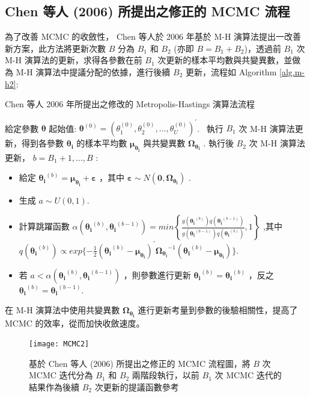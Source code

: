 \documentclass[12pt,a4paper]{article}
\begin{document}
\begin{CJK}{UTF8}{bkai}
\subsection*{Chen 等人 (2006) 所提出之修正的 MCMC 流程}\label{sec:6.1}
為了改善 MCMC 的收斂性， Chen 等人於 2006 年基於 M-H 演算法提出一改善新方案，此方法將更新次數 $B$ 分為 $B_1$ 和 $B_2$ (亦即 $B=B_1+B_2$)，透過前 $B_1$ 次 M-H 演算法的更新，求得各參數在前 $B_1$ 次更新的樣本平均數與共變異數，並做為 M-H 演算法中提議分配的依據，進行後續 $B_2$ 更新，流程如 Algorithm \ref{alg.m-h2}:
\begin{algorithm}
	\caption{Chen 等人 2006 年所提出之修改的 Metropolis-Hastings 演算法流程}
	\label{alg:3}
	\begin{algorithmic}[1]
	\STATE 給定參數 $\bm{\theta}$ 起始值: $\bm{\theta}^{(0)} = \left(\theta_1^{(0)},\theta_2^{(0)},\dots,\theta_U^{(0)}\right)^\prime$. \
    \STATE 執行 $B_1$ 次 M-H 演算法更新，得到各參數 $\bm{\theta_i}$ 的樣本平均數 $\bm{\mu_{\theta_i}}$ 與共變異數 $\bm{\Omega_{\theta_i}}$ .
	\STATE 執行後 $B_2$ 次 M-H 演算法更新， $b =B_1+1,\dots,B$ :
	\begin{itemize}
	\item 給定 $\bm{\theta_i}^{(b)} = \bm{\mu_{\theta_i}}+ \bm{\varepsilon}$ ，其中 $\bm{\varepsilon} \sim N \left(\bm{0},\bm{\Omega_{\theta_i}}\right)$ .
    \item 生成 $a \sim U(0,1)$.
	\item 計算跳躍函數 $\alpha\left(\bm{\theta_i}^{(b)},\bm{\theta_i}^{(b-1)}\right) = min \left\{ \frac{g(\bm{\theta_i}^{(b)})q(\bm{\theta_i}^{(b-1)})}{g(\bm{\theta_i}^{(b-1)})q(\bm{\theta_i}^{(b)})},1 \right\}$ ,其中 $q(\bm{\theta_i}^{(b)}) \propto exp\{-\frac{1}{2}(\bm{\theta_i}^{(b)}-\bm{\mu_{\theta_i}})^\prime \bm{\Omega_{\theta_i}}^{-1}(\bm{\theta_i}^{(b)}-\bm{\mu_{\theta_i}})\}$.
	\item 若 $a < \alpha\left(\bm{\theta_i}^{(b)},\bm{\theta_i}^{(b-1)}\right)$ ，則參數進行更新 $\bm{\theta_i}^{(b)} = \bm{\theta_i}^{(b)}$ ，反之 $\bm{\theta_i}^{(b)} = \bm{\theta_i}^{(b-1)}$.
    \end{itemize}
	\end{algorithmic}
\label{alg.m-h2}
\end{algorithm}
\noindent
\setlength\abovedisplayskip{25pt}
\setlength\belowdisplayskip{25pt}

\noindent 
在 M-H 演算法中使用共變異數 $\bm{\Omega_{\theta_i}}$ 進行更新考量到參數的後驗相關性，提高了 MCMC 的效率，從而加快收斂速度。
\begin{figure}
\centering %
\texttt{[image: MCMC2]} %
\caption{基於  Chen 等人 (2006) 所提出之修正的 MCMC 流程圖，將 $B$ 次 MCMC 迭代分為 $B_1$ 和 $B_2$ 兩階段執行，以前 $B_1$ 次 MCMC 迭代的結果作為後續 $B_2$ 次更新的提議函數參考} %
\label{Fig.main2} %
\end{figure}
\noindent


\end{CJK}
\end{document}
